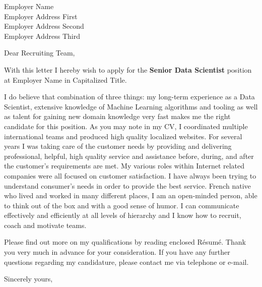 \documentclass[10pt,a4paper]{letter}
\begin{document}
 
\begin{letter}{Employer Name \\ Employer Address First \\ Employer
Address Second \\ Employer Address Third} 
\opening{Dear Recruiting Team,} 
With this letter I hereby wish to apply for the \textbf{Senior Data
Scientist} position at Employer Name in Capitalized Title.

I do believe that combination of three things: my long-term experience
as a Data Scientist, extensive knowledge of Machine Learning algorithms
and tooling as well as talent for gaining new domain knowledge very fast
makes me the right candidate for this position. As you may note in my
CV, I coordinated multiple international teams and produced high quality
localized websites. For several years I was taking care of the customer
needs by providing and delivering professional, helpful, high quality
service and assistance before, during, and after the customer's
requirements are met. My various roles within Internet related companies
were all focused on customer satisfaction. I have always been trying to
understand consumer's needs in order to provide the best service. French
native who lived and worked in many different places, I am an
open-minded person, able to think out of the box and with a good sense
of humor. I can communicate effectively and efficiently at all levels of
hierarchy and I know how to recruit, coach and motivate teams.


Please find out more on my qualifications by reading enclosed Résumé. Thank you very much in advance for your consideration. If you have any further questions regarding my candidature, please contact me via telephone or e-mail.


\closing{Sincerely yours,\\
 \\
}
 
\end{letter} 
\end{document}
